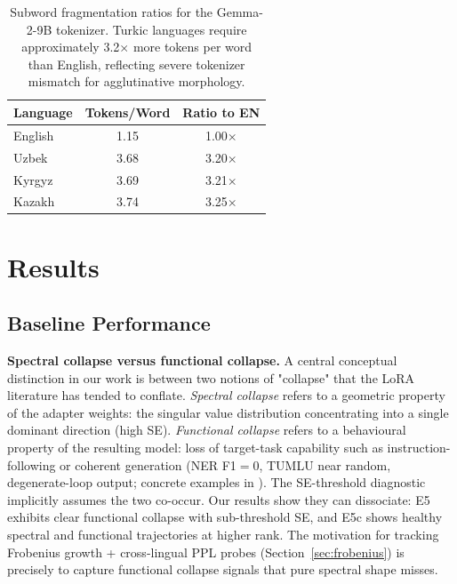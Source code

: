 \documentclass[11pt]{article}
\begin{document}
\begin{table}[t]
\centering
\small
\begin{tabular}{lcc}
\toprule
\textbf{Language} & \textbf{Tokens/Word} & \textbf{Ratio to EN} \\
\midrule
English & 1.15 & 1.00$\times$ \\
Uzbek & 3.68 & 3.20$\times$ \\
Kyrgyz & 3.69 & 3.21$\times$ \\
Kazakh & 3.74 & 3.25$\times$ \\
\bottomrule
\end{tabular}
\caption{Subword fragmentation ratios for the Gemma-2-9B tokenizer. Turkic languages require approximately 3.2$\times$ more tokens per word than English, reflecting severe tokenizer mismatch for agglutinative morphology.}
\label{tab:tokenization}
\end{table}

\section{Results}

\subsection{Baseline Performance}

\textbf{Spectral collapse versus functional collapse.} A central conceptual distinction in our work is between two notions of "collapse" that the LoRA literature has tended to conflate. \emph{Spectral collapse} refers to a geometric property of the adapter weights: the singular value distribution concentrating into a single dominant direction (high SE). \emph{Functional collapse} refers to a behavioural property of the resulting model: loss of target-task capability such as instruction-following or coherent generation (NER F1$=0$, TUMLU near random, degenerate-loop output; concrete examples in ). The SE-threshold diagnostic \citep{biderman2024lora} implicitly assumes the two co-occur. Our results show they can dissociate: E5 exhibits clear functional collapse with sub-threshold SE, and E5c shows healthy spectral and functional trajectories at higher rank. The motivation for tracking Frobenius growth + cross-lingual PPL probes (Section~\ref{sec:frobenius}) is precisely to capture functional collapse signals that pure spectral shape misses.
\end{document}
